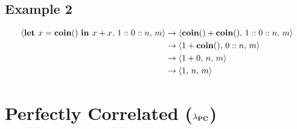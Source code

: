 \documentclass{article}
\begin{document}
	\subsection{Example 2}
			\begin{equation*}
				\begin{split}
					\langle \text{\bf let } x = {\bf coin ()} \text{ \bf in } x + x,\, 1::0::n,\, m\rangle
					&\rightarrow \langle {\bf coin ()} + {\bf coin ()},\, 1::0::n,\, m\rangle \\
					&\rightarrow \langle 1 + {\bf coin ()},\, 0::n,\, m\rangle \\
					&\rightarrow \langle 1 + 0,\, n,\, m\rangle \\
					&\rightarrow \langle 1,\, n,\, m\rangle \\
				\end{split}
			\end{equation*}
			
\newpage
	\section{Perfectly Correlated ($\lambda_{\bf PC}$)}
\end{document}
